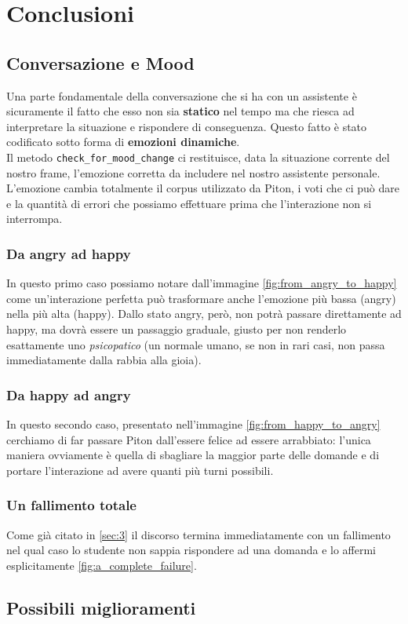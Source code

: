 \section{Conclusioni}
\subsection{Conversazione e Mood}
Una parte fondamentale della conversazione che si ha con un assistente è sicuramente il fatto che esso non sia \textbf{statico} nel tempo ma che riesca ad interpretare la situazione e rispondere di conseguenza.
Questo fatto è stato codificato sotto forma di \textbf{emozioni dinamiche}.
\\
Il metodo \texttt{check\_for\_mood\_change} ci restituisce, data la situazione corrente del nostro frame, l'emozione corretta da includere nel nostro assistente personale. L'emozione cambia totalmente il corpus utilizzato da Piton, i voti che ci può dare e la quantità di errori che possiamo effettuare prima che l'interazione non si interrompa.
\subsubsection{Da angry ad happy}
In questo primo caso possiamo notare dall'immagine \ref{fig:from_angry_to_happy} come un'interazione perfetta può trasformare anche l'emozione più bassa (angry) nella più alta (happy). Dallo stato angry, però, non potrà passare direttamente ad happy, ma dovrà essere un passaggio graduale, giusto per non renderlo esattamente uno \textit{psicopatico} (un normale umano, se non in rari casi, non passa immediatamente dalla rabbia alla gioia).
\subsubsection{Da happy ad angry}
In questo secondo caso, presentato nell'immagine \ref{fig:from_happy_to_angry} cerchiamo di far passare Piton dall'essere felice ad essere arrabbiato: l'unica maniera ovviamente è quella di sbagliare la maggior parte delle domande e di portare l'interazione ad avere quanti più turni possibili.
\subsubsection{Un fallimento totale}
Come già citato in \ref{sec:3} il discorso termina immediatamente con un fallimento nel qual caso lo studente non sappia rispondere ad una domanda e lo affermi esplicitamente \ref{fig:a_complete_failure}.
\subsection{Possibili miglioramenti}
